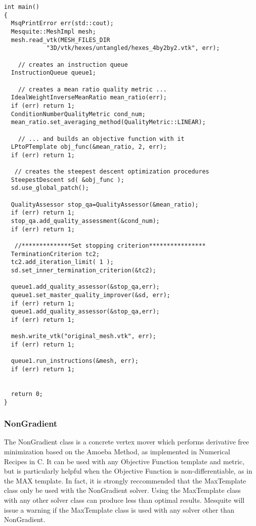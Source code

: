 \begin{lstlisting}[frame=single]
int main()
{
  MsqPrintError err(std::cout);
  Mesquite::MeshImpl mesh;
  mesh.read_vtk(MESH_FILES_DIR 
            "3D/vtk/hexes/untangled/hexes_4by2by2.vtk", err);
  
    // creates an instruction queue
  InstructionQueue queue1;
  
    // creates a mean ratio quality metric ...
  IdealWeightInverseMeanRatio mean_ratio(err);
  if (err) return 1;
  ConditionNumberQualityMetric cond_num;
  mean_ratio.set_averaging_method(QualityMetric::LINEAR);
  
    // ... and builds an objective function with it
  LPtoPTemplate obj_func(&mean_ratio, 2, err);
  if (err) return 1;

   // creates the steepest descent optimization procedures
  SteepestDescent sd( &obj_func );
  sd.use_global_patch();
  
  QualityAssessor stop_qa=QualityAssessor(&mean_ratio);
  if (err) return 1;
  stop_qa.add_quality_assessment(&cond_num);
  if (err) return 1;
    
   //**************Set stopping criterion****************
  TerminationCriterion tc2;
  tc2.add_iteration_limit( 1 );
  sd.set_inner_termination_criterion(&tc2);

  queue1.add_quality_assessor(&stop_qa,err);
  queue1.set_master_quality_improver(&sd, err); 
  if (err) return 1;
  queue1.add_quality_assessor(&stop_qa,err);
  if (err) return 1;

  mesh.write_vtk("original_mesh.vtk", err); 
  if (err) return 1;
  
  queue1.run_instructions(&mesh, err);
  if (err) return 1;
  

  return 0;
}
\end{lstlisting}

\subsubsection{NonGradient}
The NonGradient class is a concrete vertex mover which performs derivative free minimization based on the Amoeba Method, as implemented in Numerical Recipes in C.  It can be used with any Objective Function template and metric, but is particularly helpful when the Objective Function is non-differentiable, as in the MAX template. In fact, it is strongly reccommended that the MaxTemplate class only be used with the NonGradient solver.  Using the MaxTemplate class with any other solver class can produce less than optimal results. Mesquite will issue a warning if the MaxTemplate class is used with any solver other than NonGradient.  

